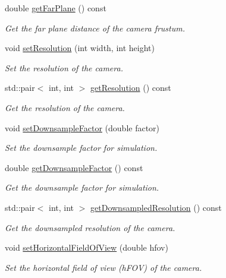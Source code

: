 \begin{DoxyCompactItemize}
double \hyperlink{classvisioncraft_1_1Viewpoint_a3ec5fe63ec14414aa864cd53518215ea}{get\+Far\+Plane} () const
\begin{DoxyCompactList}\small\item\em Get the far plane distance of the camera frustum. \end{DoxyCompactList}\item 
void \hyperlink{classvisioncraft_1_1Viewpoint_a82bc5bda68c1dc61c35cfd8f5a2befa8}{set\+Resolution} (int width, int height)
\begin{DoxyCompactList}\small\item\em Set the resolution of the camera. \end{DoxyCompactList}\item 
std\+::pair$<$ int, int $>$ \hyperlink{classvisioncraft_1_1Viewpoint_a82c0a78cac09e12c5df31a77fe930055}{get\+Resolution} () const
\begin{DoxyCompactList}\small\item\em Get the resolution of the camera. \end{DoxyCompactList}\item 
void \hyperlink{classvisioncraft_1_1Viewpoint_a07ef9c64ea32130312d1cb187320abaf}{set\+Downsample\+Factor} (double factor)
\begin{DoxyCompactList}\small\item\em Set the downsample factor for simulation. \end{DoxyCompactList}\item 
double \hyperlink{classvisioncraft_1_1Viewpoint_a238c7a9deef702d7b8660bb53ba4f08f}{get\+Downsample\+Factor} () const
\begin{DoxyCompactList}\small\item\em Get the downsample factor for simulation. \end{DoxyCompactList}\item 
std\+::pair$<$ int, int $>$ \hyperlink{classvisioncraft_1_1Viewpoint_aa6968c8ab6b7d1ee62dfee8db3a580dc}{get\+Downsampled\+Resolution} () const
\begin{DoxyCompactList}\small\item\em Get the downsampled resolution of the camera. \end{DoxyCompactList}\item 
void \hyperlink{classvisioncraft_1_1Viewpoint_a578ce8d3f798e63ebfdd07407f3a6769}{set\+Horizontal\+Field\+Of\+View} (double hfov)
\begin{DoxyCompactList}\small\item\em Set the horizontal field of view (h\+F\+OV) of the camera. \end{DoxyCompactList}\item 

\end{DoxyCompactItemize}
